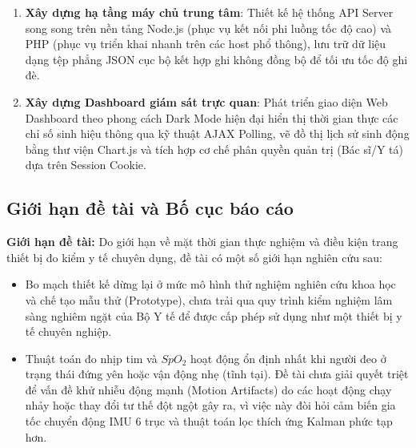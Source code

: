 \begin{enumerate}
    \item \textbf{Xây dựng hạ tầng máy chủ trung tâm}: Thiết kế hệ thống API Server song song trên nền tảng Node.js (phục vụ kết nối phi luồng tốc độ cao) và PHP (phục vụ triển khai nhanh trên các host phổ thông), lưu trữ dữ liệu dạng tệp phẳng JSON cục bộ kết hợp ghi không đồng bộ để tối ưu tốc độ ghi đè.
    \item \textbf{Xây dựng Dashboard giám sát trực quan}: Phát triển giao diện Web Dashboard theo phong cách Dark Mode hiện đại hiển thị thời gian thực các chỉ số sinh hiệu thông qua kỹ thuật AJAX Polling, vẽ đồ thị lịch sử sinh động bằng thư viện Chart.js và tích hợp cơ chế phân quyền quản trị (Bác sĩ/Y tá) dựa trên Session Cookie.
\end{enumerate}

\subsection{Giới hạn đề tài và Bố cục báo cáo}

\textbf{Giới hạn đề tài:} 
Do giới hạn về mặt thời gian thực nghiệm và điều kiện trang thiết bị đo kiểm y tế chuyên dụng, đề tài có một số giới hạn nghiên cứu sau:
\begin{itemize}
    \item Bo mạch thiết kế dừng lại ở mức mô hình thử nghiệm nghiên cứu khoa học và chế tạo mẫu thử (Prototype), chưa trải qua quy trình kiểm nghiệm lâm sàng nghiêm ngặt của Bộ Y tế để được cấp phép sử dụng như một thiết bị y tế chuyên nghiệp.
    \item Thuật toán đo nhịp tim và $SpO_2$ hoạt động ổn định nhất khi người đeo ở trạng thái đứng yên hoặc vận động nhẹ (tĩnh tại). Đề tài chưa giải quyết triệt để vấn đề khử nhiễu động mạnh (Motion Artifacts) do các hoạt động chạy nhảy hoặc thay đổi tư thế đột ngột gây ra, vì việc này đòi hỏi cảm biến gia tốc chuyển động IMU 6 trục và thuật toán lọc thích ứng Kalman phức tạp hơn.
\end{itemize}

